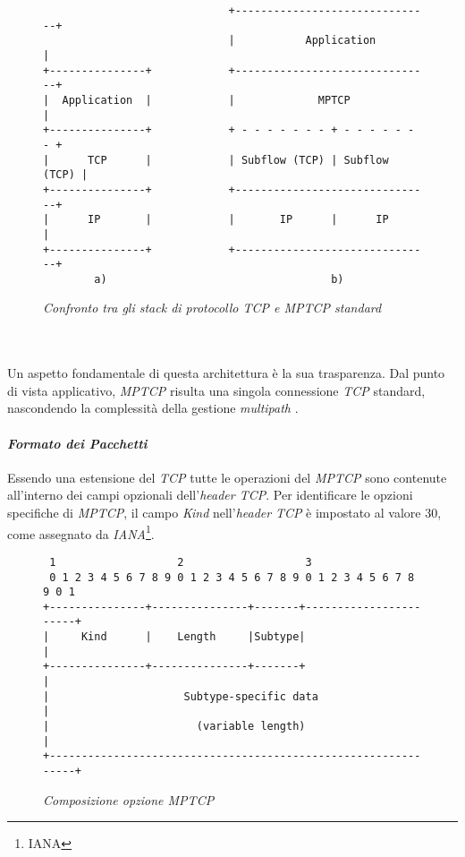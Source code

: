 \begin{figure}[!h]
  \centering
    \begin{BVerbatim}
                             +-------------------------------+
                             |           Application         |
+---------------+            +-------------------------------+
|  Application  |            |             MPTCP             |
+---------------+            + - - - - - - - + - - - - - - - +
|      TCP      |            | Subflow (TCP) | Subflow (TCP) |
+---------------+            +-------------------------------+
|      IP       |            |       IP      |      IP       |
+---------------+            +-------------------------------+
        a)                                   b)
               \end{BVerbatim}
    \caption{\emph{Confronto tra gli stack di protocollo TCP e MPTCP standard}}
    \label{comparison}
    \end{figure}
\\\\
\noindent Un aspetto fondamentale di questa architettura è la sua trasparenza. Dal punto di vista applicativo, \emph{MPTCP} risulta una singola connessione \emph{TCP} standard, nascondendo la complessità della gestione \emph{multipath} \cite{site:mptcp-design}.
\paragraph{\textit{Formato dei Pacchetti}}
\noindent Essendo una estensione del \emph{TCP} tutte le operazioni del \emph{MPTCP} sono contenute all'interno dei campi opzionali dell'\emph{header TCP}. 
Per identificare le opzioni specifiche di \emph{MPTCP}, il campo \emph{Kind} nell'\emph{header} \emph{TCP} è impostato al valore 30, come assegnato da \emph{IANA}\footnote{\gls{IANA}}.
\begin{figure}[!h]
    \centering
          \begin{BVerbatim}
 1                   2                   3
 0 1 2 3 4 5 6 7 8 9 0 1 2 3 4 5 6 7 8 9 0 1 2 3 4 5 6 7 8 9 0 1
+---------------+---------------+-------+-----------------------+
|     Kind      |    Length     |Subtype|                       |
+---------------+---------------+-------+                       |
|                     Subtype-specific data                     |
|                       (variable length)                       |
+---------------------------------------------------------------+   
        \end{BVerbatim}
    \caption{\emph{Composizione opzione MPTCP}}
    \label{mptcp-option-format}
\end{figure}


